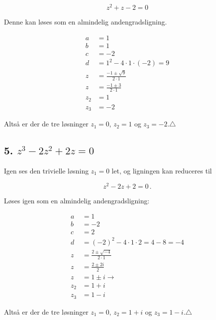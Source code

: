 \documentclass[a4paper, 12pt]{article}
\begin{document}
$$z^2 + z -2 =0$$

Denne kan løses som en almindelig andengradsligning.

\begin{align*}
    a &= 1 \\
    b &= 1 \\
    c &= -2 \\
    d &= 1^2 - 4\cdot 1 \cdot (-2) = 9 \\
    z &= \frac{-1 \pm \sqrt{9}}{2 \cdot 1} \\
    z &= \frac{-1 \pm 3}{2 \cdot 1} \\
    z_2 &= 1 \\
    z_3 &= -2 
\end{align*}

Altså er der de tre løsninger \(z_1=0\), \(z_2=1\) og \(z_3=-2\).\(\triangle\)


\subsection*{5. \(z^3-2z^2 + 2z =0\)}
\label{sec:orge1972d0}

Igen ses den trivielle løsning \(z_1=0\) let, og ligningen kan reduceres til

$$z^2 -2z + 2 =0\,.$$

Løses igen som en almindelig andengradsligning:

\begin{align*}
    a &= 1 \\
    b &= -2 \\
    c &= 2 \\
    d &= (-2)^2-4\cdot 1\cdot 2 = 4 -8 = -4 \\
    z &= \frac{2 \pm \sqrt{-4}}{2 \cdot 1} \\
    z &= \frac{2 \pm 2i}{2 } \\
    z &= 1 \pm i \to \\
    z_2 &= 1 + i  \\
    z_3 &= 1 - i 
\end{align*}

Altså er der de tre løsninger \(z_1=0\), \(z_2 =1+i\) og \(z_3=1-i\).\(\triangle\)
\end{document}
